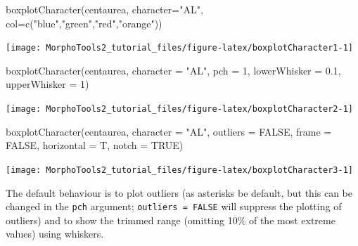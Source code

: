\documentclass[
  11pt,
  a4paper]{article}
\newenvironment{Shaded}{\begin{snugshade}}{\end{snugshade}}
\newcommand{\AttributeTok}[1]{\textcolor[rgb]{0.77,0.63,0.00}{#1}}
\newcommand{\ConstantTok}[1]{\textcolor[rgb]{0.00,0.00,0.00}{#1}}
\newcommand{\DecValTok}[1]{\textcolor[rgb]{0.00,0.00,0.81}{#1}}
\newcommand{\FloatTok}[1]{\textcolor[rgb]{0.00,0.00,0.81}{#1}}
\newcommand{\FunctionTok}[1]{\textcolor[rgb]{0.00,0.00,0.00}{#1}}
\newcommand{\NormalTok}[1]{#1}
\newcommand{\StringTok}[1]{\textcolor[rgb]{0.31,0.60,0.02}{#1}}
\begin{document}
\begin{Shaded}
\begin{Highlighting}[]
\FunctionTok{boxplotCharacter}\NormalTok{(centaurea, }\AttributeTok{character=}\StringTok{"AL"}\NormalTok{, }\AttributeTok{col=}\FunctionTok{c}\NormalTok{(}\StringTok{"blue"}\NormalTok{,}\StringTok{"green"}\NormalTok{,}\StringTok{"red"}\NormalTok{,}\StringTok{"orange"}\NormalTok{))}
\end{Highlighting}
\end{Shaded}

\begin{center}\texttt{[image: MorphoTools2\_tutorial\_files/figure-latex/boxplotCharacter1-1]} \end{center}

\begin{Shaded}
\begin{Highlighting}[]
\FunctionTok{boxplotCharacter}\NormalTok{(centaurea, }\AttributeTok{character =} \StringTok{"AL"}\NormalTok{, }\AttributeTok{pch =} \DecValTok{1}\NormalTok{,}
                 \AttributeTok{lowerWhisker =} \FloatTok{0.1}\NormalTok{, }\AttributeTok{upperWhisker =} \DecValTok{1}\NormalTok{)}
\end{Highlighting}
\end{Shaded}

\begin{center}\texttt{[image: MorphoTools2\_tutorial\_files/figure-latex/boxplotCharacter2-1]} \end{center}

\begin{Shaded}
\begin{Highlighting}[]
\FunctionTok{boxplotCharacter}\NormalTok{(centaurea, }\AttributeTok{character =} \StringTok{"AL"}\NormalTok{, }\AttributeTok{outliers =} \ConstantTok{FALSE}\NormalTok{,}
                 \AttributeTok{frame =} \ConstantTok{FALSE}\NormalTok{, }\AttributeTok{horizontal =}\NormalTok{ T, }\AttributeTok{notch =} \ConstantTok{TRUE}\NormalTok{)}
\end{Highlighting}
\end{Shaded}

\begin{center}\texttt{[image: MorphoTools2\_tutorial\_files/figure-latex/boxplotCharacter3-1]} \end{center}

The default behaviour is to plot outliers (as asterisks be default, but
this can be changed in the \texttt{pch} argument;
\texttt{outliers\ =\ FALSE} will suppress the plotting of outliers) and
to show the trimmed range (omitting 10\% of the most extreme values)
using whiskers.
\end{document}
